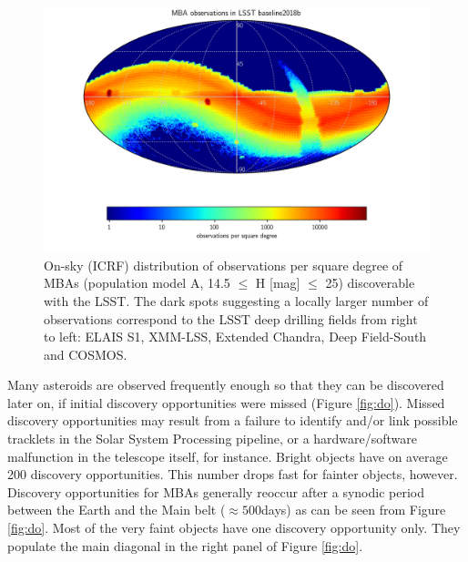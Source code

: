 \begin{figure}
\begin{center}
\includegraphics[width=0.70\linewidth]{figs/mba_obs_hpmap.png}
\end{center}
\caption{On-sky (ICRF) distribution of observations per square degree of MBAs (population model A, 14.5 $\le$ H [mag] $\le$ 25) discoverable with the \gls{LSST}. The dark spots suggesting a locally larger number of observations correspond to the \gls{LSST} deep drilling fields from right to left: ELAIS S1, \gls{XMM}-LSS, Extended Chandra, Deep Field-South and COSMOS.}
\label{fig:mba_obs_sky}       %
\end{figure}
%
Many asteroids are observed frequently enough so that they can be discovered later on, if initial discovery opportunities were missed (Figure \ref{fig:do}). Missed discovery opportunities may result from a failure to identify and/or link possible tracklets in the Solar System Processing \gls{pipeline}, or a hardware/software malfunction in the telescope itself, for instance. Bright objects have on average 200 discovery opportunities. This number drops fast for fainter objects, however. Discovery opportunities for MBAs generally reoccur after a synodic period between the Earth and the Main belt ($\approx 500$days) as can be seen from Figure \ref{fig:do}. Most of the very faint objects have one discovery opportunity only. They populate the main diagonal in the right panel of Figure \ref{fig:do}. 
%
